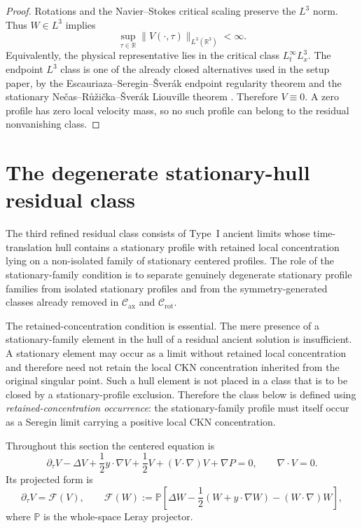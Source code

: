 \documentclass[11pt]{amsart}
\numberwithin{equation}{section}
\theoremstyle{plain}
\theoremstyle{definition}
\theoremstyle{remark}
\newcommand{\Cax}{\mathcal C_{\mathrm{ax}}}
\newcommand{\Crot}{\mathcal C_{\mathrm{rot}}}
\begin{document}
\begin{proof}
Rotations and the Navier--Stokes critical scaling preserve the \(L^3\) norm.
Thus \(W\in L^3\) implies
\[
   \sup_{\tau\in\mathbb R}\|V(\cdot,\tau)\|_{L^3(\mathbb R^3)}<\infty .
\]
Equivalently, the physical representative lies in the critical class
\(L^\infty_tL^3_x\).  The endpoint \(L^3\) class is one of the already closed
alternatives used in the setup paper, by the Escauriaza--Seregin--\v Sver\'ak endpoint
regularity theorem \cite{ESS2003} and the stationary
Ne\v cas--R\r u\v zi\v cka--\v Sver\'ak Liouville theorem \cite{NRS1996}.
Therefore
\(V\equiv0\).  A zero profile has zero local velocity mass, so no such profile
can belong to the residual
nonvanishing class.
\end{proof}


\section{The degenerate stationary-hull residual class}
\label{sec:R3-degenerate-stationary-hull}

The third refined residual class consists of Type~I ancient limits whose
time-translation hull contains a stationary
profile with retained local concentration lying on a non-isolated family of
stationary centered profiles.  The role of the stationary-family condition is to separate genuinely degenerate
stationary profile families from isolated stationary profiles and from the
symmetry-generated classes already removed in \(\Cax\) and \(\Crot\).

The retained-concentration condition is essential.  The mere presence of a
stationary-family element in the hull of a residual ancient solution is insufficient.  A
stationary element may occur as a limit without retained local concentration and
therefore need not retain the local CKN concentration inherited from the
original singular point.  Such a hull element is not placed in a class
that is to be closed by a
stationary-profile exclusion.  Therefore the class below is defined using
\emph{retained-concentration occurrence}: the stationary-family profile must
itself occur as a Seregin limit carrying a positive local CKN concentration.

Throughout this section the centered equation is
\begin{equation}\label{eq:centered-R3}
   \partial_\tau V-\Delta V+\frac12 y\cdot\nabla V+\frac12 V
   +(V\cdot\nabla)V+\nabla P=0,
   \qquad \nabla\cdot V=0 .
\end{equation}
Its projected form is
\begin{equation}\label{eq:projected-centered-R3}
   \partial_\tau V=\mathcal F(V),
   \qquad
   \mathcal F(W)
   :=
   \mathbb P\left[
      \Delta W-\frac12(W+y\cdot\nabla W)-(W\cdot\nabla)W
   \right],
\end{equation}
where \(\mathbb P\) is the whole-space Leray projector.
\end{document}
